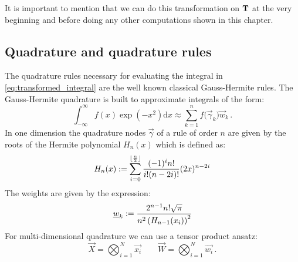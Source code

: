 \documentclass[a4paper,10pt]{article}
\begin{document}
It is important to mention that we can do this transformation on $\mathbf{T}$
at the very beginning and before doing any other computations shown
in this chapter.


\subsection{Quadrature and quadrature rules}


The quadrature rules necessary for evaluating the integral
in \eqref{eq:transformed_integral} are the well known
classical Gauss-Hermite rules. The Gauss-Hermite quadrature
is built to approximate integrals of the form:
\begin{equation}
  \int_{-\infty}^\infty f\left(x\right) \exp(-x^2) \mathrm{d}x
  \approx
  \sum_{k=1}^n f\bigl(\vec{\gamma}_k\bigr) \vec{w}_k \,.
\end{equation}
In one dimension the quadrature nodes $\vec{\gamma}$ of a rule of
order $n$ are given by the roots of the Hermite polynomial $H_n(x)$
which is defined as:
\begin{equation}
  H_n(x) := \sum_{i=0}^{\lfloor\frac{n}{2}\rfloor}
                   \frac{(-1)^i n!}{i!(n-2i)!} (2x)^{n-2i}
\end{equation}
The weights are given by the expression:
\begin{equation}
  \underline{w}_k := \frac{2^{n-1} n! \sqrt{\pi}}{n^2 \left(H_{n-1}(x_i)\right)^2}
\end{equation}
For multi-dimensional quadrature we can use a tensor product ansatz:
\begin{equation}
  \vec{X} = \bigotimes_{i=1}^N \vec{x_i} \quad\quad
  \vec{W} = \bigotimes_{i=1}^N \vec{w_i} \,.
\end{equation}
\end{document}
